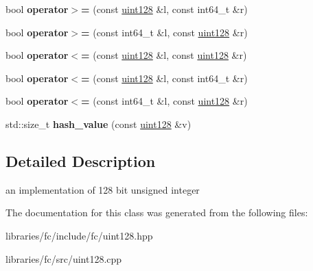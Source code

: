 \begin{DoxyCompactItemize}
\mbox{\label{classfc_1_1uint128_a729f1289b2a440a28041bd71a0c86a33}} 
bool {\bfseries operator$>$=} (const \mbox{\hyperlink{classfc_1_1uint128}{uint128}} \&l, const int64\+\_\+t \&r)
\item 
\mbox{\label{classfc_1_1uint128_a1e31039514826159b473182389a28733}} 
bool {\bfseries operator$>$=} (const int64\+\_\+t \&l, const \mbox{\hyperlink{classfc_1_1uint128}{uint128}} \&r)
\item 
\mbox{\label{classfc_1_1uint128_a3a148da4783547936528ef4db13f2bc9}} 
bool {\bfseries operator$<$=} (const \mbox{\hyperlink{classfc_1_1uint128}{uint128}} \&l, const \mbox{\hyperlink{classfc_1_1uint128}{uint128}} \&r)
\item 
\mbox{\label{classfc_1_1uint128_adaaf2a033c2fbd62a1507b44cf027583}} 
bool {\bfseries operator$<$=} (const \mbox{\hyperlink{classfc_1_1uint128}{uint128}} \&l, const int64\+\_\+t \&r)
\item 
\mbox{\label{classfc_1_1uint128_a8849ef7a762ba733502279de77a596a9}} 
bool {\bfseries operator$<$=} (const int64\+\_\+t \&l, const \mbox{\hyperlink{classfc_1_1uint128}{uint128}} \&r)
\item 
\mbox{\label{classfc_1_1uint128_aefb55fd69a2d3036ca639f7f482915a5}} 
std\+::size\+\_\+t {\bfseries hash\+\_\+value} (const \mbox{\hyperlink{classfc_1_1uint128}{uint128}} \&v)
\end{DoxyCompactItemize}


\subsection{Detailed Description}
an implementation of 128 bit unsigned integer 

The documentation for this class was generated from the following files\+:\begin{DoxyCompactItemize}
\item 
libraries/fc/include/fc/uint128.\+hpp\item 
libraries/fc/src/uint128.\+cpp\end{DoxyCompactItemize}
